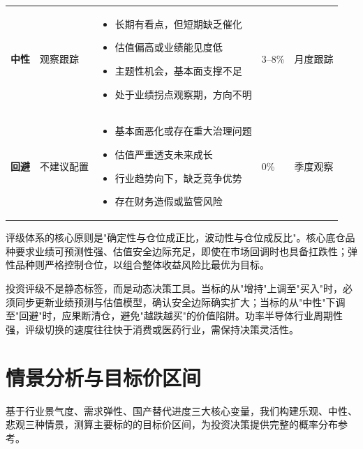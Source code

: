 \begin{exhibitbox}[表 10-1：投资评级体系与配置标准]
\begin{tabularx}{\textwidth}{L{1.6cm} L{1.8cm} L{5.2cm} L{2.0cm} L{2.5cm}}
\textbf{中性} & 观察跟踪 & \vspace{-0.8em}\begin{itemize}[leftmargin=1.2em, topsep=0pt, partopsep=0pt]
  \item 长期有看点，但短期缺乏催化
  \item 估值偏高或业绩能见度低
  \item 主题性机会，基本面支撑不足
  \item 处于业绩拐点观察期，方向不明
\end{itemize}\vspace{-0.8em} & 3–8\% & 月度跟踪 \\
\textbf{回避} & 不建议配置 & \vspace{-0.8em}\begin{itemize}[leftmargin=1.2em, topsep=0pt, partopsep=0pt]
  \item 基本面恶化或存在重大治理问题
  \item 估值严重透支未来成长
  \item 行业趋势向下，缺乏竞争优势
  \item 存在财务造假或监管风险
\end{itemize}\vspace{-0.8em} & 0\% & 季度观察 \\
\bottomrule
\end{tabularx}
\end{exhibitbox}

评级体系的核心原则是"确定性与仓位成正比，波动性与仓位成反比"。核心底仓品种要求业绩可预测性强、估值安全边际充足，即使在市场回调时也具备扛跌性；弹性品种则严格控制仓位，以组合整体收益风险比最优为目标。

\begin{keyinsight}[评级体系执行要点]
投资评级不是静态标签，而是动态决策工具。当标的从"增持"上调至"买入"时，必须同步更新业绩预测与估值模型，确认安全边际确实扩大；当标的从"中性"下调至"回避"时，应果断清仓，避免"越跌越买"的价值陷阱。功率半导体行业周期性强，评级切换的速度往往快于消费或医药行业，需保持决策灵活性。
\end{keyinsight}

\section{情景分析与目标价区间}

基于行业景气度、需求弹性、国产替代进度三大核心变量，我们构建乐观、中性、悲观三种情景，测算主要标的的目标价区间，为投资决策提供完整的概率分布参考。

